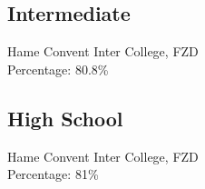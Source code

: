 \documentclass[localFont,alternative,10pt,compact]{main}
\begin{document}
\begin{minipage}[t]{0.33\textwidth}
        \subsection{Intermediate}
        Hame Convent Inter College, FZD\\
        Percentage: 80.8\%\\
        \vspace{8pt}

        \subsection{High School}
        Hame Convent Inter College, FZD\\
        Percentage: 81\%
        \sectionsep
    \end{minipage}
    \hspace*{0pt}\hfill
\end{document}
